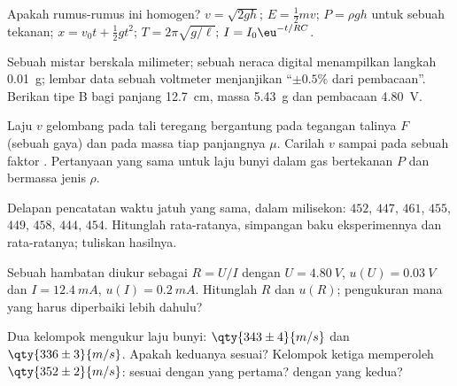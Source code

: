 \begin{exercise}[$\star$]\label{exo:b1:units-dimensions:3}
Apakah rumus-rumus ini homogen? $v = \sqrt{2gh}$;
$E = \tfrac12 m v$; $P = \rho g h$ untuk sebuah tekanan; $x = v_0 t +
\tfrac12 g t^2$; $T = 2\pi\sqrt{g/\ell}$; $I = I_0 \eu^{-t/RC}$.
\end{exercise}

\begin{exercise}[$\star$]\label{exo:b1:units-dimensions:4}
Sebuah mistar berskala milimeter; sebuah neraca digital menampilkan
langkah \qty{0.01}{g}; lembar data sebuah voltmeter menjanjikan
``$\pm 0.5\%$ dari pembacaan''. Berikan  tipe B bagi
panjang \qty{12.7}{cm}, massa \qty{5.43}{g} dan pembacaan \qty{4.80}{V}.
\end{exercise}

\begin{exercise}[$\star\star$]\label{exo:b1:units-dimensions:5}
Laju $v$ gelombang pada tali teregang bergantung pada tegangan talinya
$F$ (sebuah gaya) dan pada massa tiap  panjangnya $\mu$. Carilah
$v$ sampai pada sebuah faktor . Pertanyaan yang sama
untuk laju bunyi dalam gas bertekanan $P$ dan bermassa jenis $\rho$.
\end{exercise}

\begin{exercise}[$\star\star$]\label{exo:b1:units-dimensions:6}
Delapan pencatatan waktu jatuh yang sama, dalam milisekon: $452$, $447$,
$461$, $455$, $449$, $458$, $444$, $454$. Hitunglah rata-ratanya,
simpangan baku eksperimennya dan  rata-ratanya;
tuliskan hasilnya.
\end{exercise}

\begin{exercise}[$\star\star$]\label{exo:b1:units-dimensions:7}
Sebuah hambatan diukur sebagai $R = U/I$ dengan $U = \qty{4.80}{V}$,
$u(U) = \qty{0.03}{V}$ dan $I = \qty{12.4}{mA}$, $u(I) = \qty{0.2}{mA}$.
Hitunglah $R$ dan $u(R)$; pengukuran mana yang harus diperbaiki lebih dahulu?
\end{exercise}

\begin{exercise}[$\star\star$]\label{exo:b1:units-dimensions:8}
Dua kelompok mengukur laju bunyi: $\qty{343\pm4}{m/s}$ dan
$\qty{336\pm3}{m/s}$. Apakah keduanya sesuai? Kelompok ketiga
memperoleh $\qty{352\pm2}{m/s}$: sesuai dengan yang pertama? dengan yang kedua?
\end{exercise}

